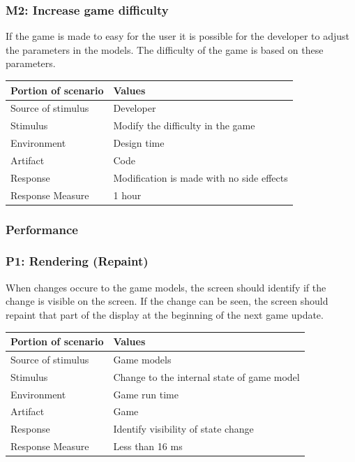 \subsubsection* {M2: Increase game difficulty}
If the game is made to easy for the user it is possible for the developer to adjust the
parameters in the models. The difficulty of the game is based on these parameters.

\begin{tabular}{| l | l |}
	\hline
	{\bf Portion of scenario} & {\bf Values} \\ \hline
	Source of stimulus & Developer\\ \hline
	Stimulus & Modify the difficulty in the game\\ \hline
	Environment & Design time \\ \hline
	Artifact & Code \\ \hline
	Response & Modification is made with no side effects\\ \hline
	Response Measure & 1 hour\\ \hline
\end{tabular}

\subsubsection{Performance}

\subsubsection*{P1: Rendering (Repaint)}
When changes occure to the game models, the screen should identify if the change 
is visible on the screen. If the change can be seen, the screen should repaint 
that part of the display at the beginning of the next game update.

\begin{tabular}{| l | l |}
	\hline
	{\bf Portion of scenario} & {\bf Values} \\ \hline
	Source of stimulus & Game models\\ \hline
	Stimulus & Change to the internal state of game model\\ \hline
	Environment & Game run time \\ \hline
	Artifact &  Game \\ \hline
	Response & Identify visibility of state change\\ \hline
	Response Measure & Less than 16 ms\\ \hline
\end{tabular}

